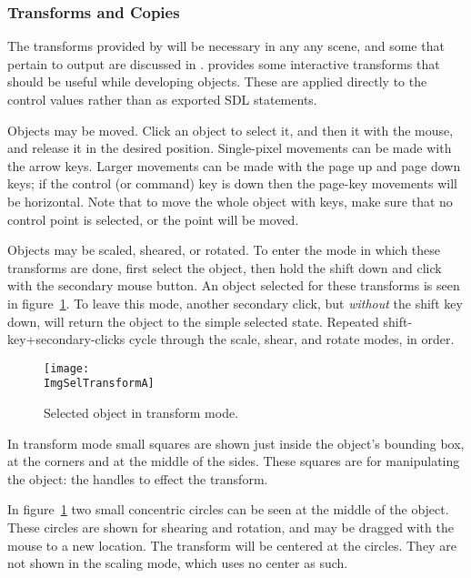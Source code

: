 			\subsubsection{\dtypkgu{} Transforms and Copies}%
			\label{sssec:epspline_transforms}
			The transforms provided by \IXpov{} 
			will be necessary in any any scene, and some
			that pertain to \IXpkg{} output are
			discussed in .
			\IXpkgu{} provides some interactive transforms
			that should be useful while developing objects.
			These are applied directly to the control 
			values rather than as exported SDL statements.
			
			Objects may be moved. Click an object to select it,
			and then  it with the mouse, and
			release it in the desired position. Single-pixel
			movements can be made with the arrow keys. Larger
			movements can be made with the page up and page down
			keys; if the control (or command) key is down then
			the page-key movements will be horizontal. Note that
			to move the whole object with keys, make sure that
			no control point is selected, or the point will be
			moved.
			
			Objects may be scaled, sheared, or rotated.
			To enter the mode in which these transforms are
			done, first select the object, then hold the
			shift  down and click with the secondary
			mouse button. An object selected for these
			transforms is seen in figure~\ref{fig:sel_for_trans_a}.
			To leave this mode, another secondary click, but
			\emph{without} the shift key down, will return
			the object to the simple selected state.
			Repeated shift-key+secondary-clicks
			cycle through the scale, shear, and rotate modes,
			in order.

			\begin{figure}[htb!]
			\centering
			\texttt{[image: \\ImgSelTransformA]}
			\caption{Selected object in transform mode.}
			\label{fig:sel_for_trans_a}
			\end{figure}
			
			In transform mode small squares are
			shown just inside the object's bounding box, at the
			corners and at the middle of the sides. These
			squares are  for manipulating
			the object:  the handles to effect the
			transform.
			
			In figure~\ref{fig:sel_for_trans_a}
			two small concentric circles can be seen at the
			middle of the object. These circles are shown for
			shearing and rotation, and may be dragged with the
			mouse to a new location.
			The transform will be centered at the circles.
			They are not shown in the scaling mode, which uses no
			center as such.
			
